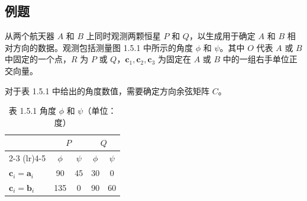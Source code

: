 \subsection*{例题}
从两个航天器 \(A\) 和 \(B\) 上同时观测两颗恒星 \(P\) 和 \(Q\)，以生成用于确定 \(A\) 和 \(B\) 相对方向的数据。观测包括测量图 1.5.1 中所示的角度 \(\phi\) 和 \(\psi\)。其中 \(O\) 代表 \(A\) 或 \(B\) 中固定的一个点，\(R\) 为 \(P\) 或 \(Q\)，\(\mathbf{c}_1, \mathbf{c}_2, \mathbf{c}_3\) 为固定在 \(A\) 或 \(B\) 中的一组右手单位正交向量。

对于表 1.5.1 中给出的角度数值，需要确定方向余弦矩阵 \(C\)。

\begin{table}[h]
\centering
\caption{表 1.5.1 角度 \(\phi\) 和 \(\psi\)（单位：度）}
\begin{tabular}{l c c c c}
\toprule
 & \multicolumn{2}{c}{\(P\)} & \multicolumn{2}{c}{\(Q\)} \\
\cmidrule(lr){2-3} \cmidrule(lr){4-5}
 & \(\phi\) & \(\psi\) & \(\phi\) & \(\psi\) \\
\midrule
\(\mathbf{c}_i = \mathbf{a}_i\) & 90 & 45 & 30 & 0 \\
\(\mathbf{c}_i = \mathbf{b}_i\) & 135 & 0 & 90 & 60 \\
\bottomrule
\end{tabular}
\end{table}

\begin{table}[h]
\centering
\caption{表 1.5.2 出现在 \(\boldsymbol{\sigma}\) 中的向量}

\end{table}

